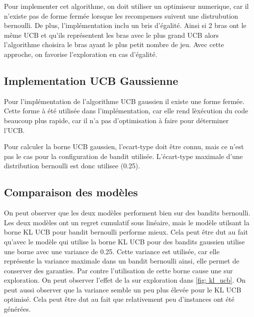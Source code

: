 \documentclass[letterpaper,11pt]{article}
\begin{document}
Pour implementer cet algorithme, on doit utiliser un optimiseur numerique, car il n'existe pas de forme fermée lorsque les recompenses suivent une distrubution bernoulli.
De plus, l'implémentation inclu un bris d'égalité.
Ainsi si 2 bras ont le même UCB et qu'ils représentent les bras avec le plus grand UCB alors l'algorithme choisira le bras ayant le plus petit nombre de jeu. Avec cette approche, on favorise l'exploration en cas d'égalité.

\subsection{Implementation UCB Gaussienne}

Pour l'implémentation de l'algorithme UCB gaussien il existe une forme fermée.
Cette forme à été utilisée dans l'implémentation, car elle rend lèxécution du code beaucoup plus rapide, car il n'a pas d'optimisation à faire pour déterminer l'UCB.

Pour calculer la borne UCB gaussien, l'ecart-type doit être connu, mais ce n'est pas le cas pour la configuration de bandit utilisée.
L'écart-type maximale d'une distribution bernoulli est donc utilisee (0.25).

\subsection{Comparaison des modèles}
On peut observer que les deux modèles performent bien sur des bandits bernoulli.
Les deux modèles ont un regret cumulatif sous linéaire, mais le modèle utilsant la borne KL UCB pour bandit bernoulli performe mieux.
Cela peut être dut au fait qu'avec le modèle qui utilise la borne KL UCB pour des bandits gaussien utilise une borne avec une variance de 0.25.
Cette variance est utilisée, car elle représente la variance maximale dans un bandit bernoulli ainsi, elle permet de conserver des garanties.
Par contre l'utilisation de cette borne cause une sur exploration.
On peut observer l'effet de la sur exploration dans \ref{fig: kl_ucb}.
On peut aussi observer que la variance semble un peu plus élevée pour le KL UCB optimisé.
Cela peut être dut au fait que relativement peu d'instances ont été générées.
\end{document}
